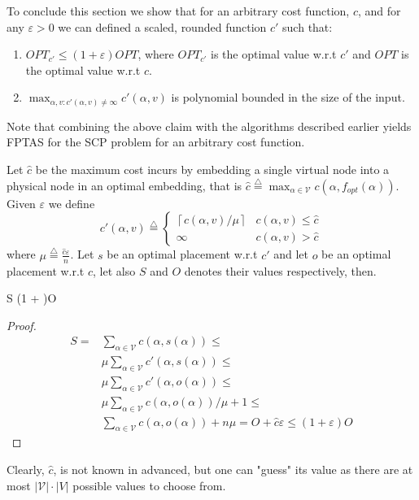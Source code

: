 \documentclass[runningheads]{llncs}
\newcommand{\eqdf}{\stackrel{\scriptscriptstyle \triangle}{=}}
\newcommand{\ceil}[1]{\left\lceil {#1} \right\rceil}
\newcommand{\scp}{\textsc{SCP}\xspace}
\newcommand{\calV}{\mathcal{V}}
\begin{document}
To conclude this section we show that for an arbitrary cost function, $c$,
and for any $\varepsilon > 0$ 
we can defined a scaled, rounded function $c'$ such that:
\begin{enumerate}
\item $OPT_{c'} \leq (1 + \varepsilon)OPT$, where $OPT_{c'}$ is the optimal
value w.r.t $c'$ and $OPT$ is the optimal value w.r.t $c$.
\item $\max_{\alpha, v : c'(\alpha, v) \neq \infty}c'(\alpha, v)$ is polynomial
bounded in the size of the input.
\end{enumerate}
Note that combining the above claim with the algorithms described
earlier yields FPTAS for the \scp{} problem for an arbitrary cost function.

Let $\hat{c}$ be the maximum cost incurs by embedding a single virtual node into 
a physical node in an optimal embedding, 
that is $\hat{c} \eqdf \max_{\alpha \in \calV}c(\alpha, f_{opt}(\alpha))$.
Given $\varepsilon$ we define 
$$
c'(\alpha, v) \eqdf
\begin{cases}
\ceil{c(\alpha, v)/\mu} & c(\alpha, v) \leq \hat{c}
\\
\infty & c(\alpha, v) > \hat{c}
\end{cases}
$$
where 
$
\mu \eqdf \frac{\hat{c}\varepsilon}{n}
$.
Let $s$ be an optimal placement w.r.t $c'$ 
and let $o$ be an optimal placement w.r.t $c$, 
let also $S$ and $O$ denotes their values respectively, then.
\begin{lemma}
S \leq (1 + \varepsilon)O
\end{lemma}
\begin{proof}
\begin{align*}
S = & \sum_{\alpha \in \calV}c(\alpha, s(\alpha)) \leq
\\&
\mu\sum_{\alpha \in \calV}c'(\alpha, s(\alpha)) \leq
\\&
\mu\sum_{\alpha \in \calV}c'(\alpha, o(\alpha)) \leq
\\&
\mu\sum_{\alpha \in \calV}c(\alpha, o(\alpha))/\mu + 1 \leq
\\&
\sum_{\alpha \in \calV}c(\alpha, o(\alpha)) + n\mu =
O + \hat{c}\varepsilon \leq (1 + \varepsilon)O
\end{align*}
\end{proof}
Clearly, $\hat{c}$, is not known in advanced, but one can "guess" 
its value as there are at most
$|\calV| \cdot |V|$ possible values to choose from.


\end{document}
